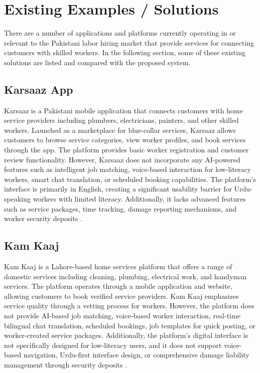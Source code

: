 \documentclass[12pt,a4paper]{report}
\begin{document}
\section{Existing Examples / Solutions}

There are a number of applications and platforms currently operating in or relevant to the Pakistani labor hiring market that provide services for connecting customers with skilled workers. In the following section, some of these existing solutions are listed and compared with the proposed system.

\subsection{Karsaaz App}
Karsaaz is a Pakistani mobile application that connects customers with home service providers including plumbers, electricians, painters, and other skilled workers. Launched as a marketplace for blue-collar services, Karsaaz allows customers to browse service categories, view worker profiles, and book services through the app. The platform provides basic worker registration and customer review functionality. However, Karsaaz does not incorporate any AI-powered features such as intelligent job matching, voice-based interaction for low-literacy workers, smart chat translation, or scheduled booking capabilities. The platform's interface is primarily in English, creating a significant usability barrier for Urdu-speaking workers with limited literacy. Additionally, it lacks advanced features such as service packages, time tracking, damage reporting mechanisms, and worker security deposits \cite{karsaaz}.

\subsection{Kam Kaaj}
Kam Kaaj is a Lahore-based home services platform that offers a range of domestic services including cleaning, plumbing, electrical work, and handyman services. The platform operates through a mobile application and website, allowing customers to book verified service providers. Kam Kaaj emphasizes service quality through a vetting process for workers. However, the platform does not provide AI-based job matching, voice-based worker interaction, real-time bilingual chat translation, scheduled bookings, job templates for quick posting, or worker-created service packages. Additionally, the platform's digital interface is not specifically designed for low-literacy users, and it does not support voice-based navigation, Urdu-first interface design, or comprehensive damage liability management through security deposits \cite{kamkaaj}.
\end{document}
